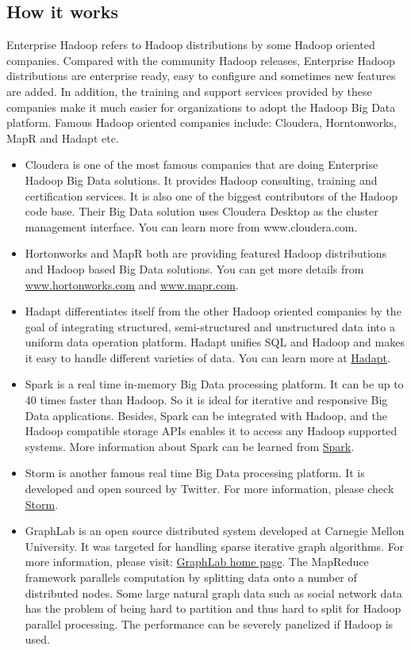 \subsection*{How it works}
Enterprise Hadoop refers to Hadoop distributions by some Hadoop oriented companies. Compared with the community Hadoop releases, Enterprise Hadoop distributions are enterprise ready, easy to configure and sometimes new features are added. In addition, the training and support services provided by these companies make it much easier for organizations to adopt the Hadoop Big Data platform. Famous Hadoop oriented companies include: Cloudera, Horntonworks, MapR and Hadapt etc.
\begin{itemize}
  \item Cloudera is one of the most famous companies that are doing Enterprise Hadoop Big Data solutions. It provides Hadoop consulting, training and certification services. It is also one of the biggest contributors of the Hadoop code base. Their Big Data solution uses Cloudera Desktop as the cluster management interface. You can learn more from www.cloudera.com.
  \item Hortonworks and MapR both are providing featured Hadoop distributions and Hadoop based Big Data solutions. You can get more details from \url{www.hortonworks.com} and \url{www.mapr.com}.
  \item Hadapt differentiates itself from the other Hadoop oriented companies by the goal of integrating structured, semi-structured and unstructured data into a uniform data operation platform. Hadapt unifies SQL and Hadoop and makes it easy to handle different varieties of data. You can learn more at \href{http://hadapt.com/}{Hadapt}.
  \item Spark is a real time in-memory Big Data processing platform. It can be up to 40 times faster than Hadoop. So it is ideal for iterative and responsive Big Data applications. Besides, Spark can be integrated with Hadoop, and the Hadoop compatible storage APIs enables it to access any Hadoop supported systems. More information about Spark can be learned from \href{http://spark-project.org/}{Spark}.
  \item Storm is another famous real time Big Data processing platform. It is developed and open sourced by Twitter. For more information, please check \href{http://storm-project.net/}{Storm}.
  \item GraphLab is an open source distributed system developed at Carnegie Mellon University. It was targeted for handling sparse iterative graph algorithms. For more information, please visit: \href{http://graphlab.org/}{GraphLab home page}. The MapReduce framework parallels computation by splitting data onto a number of distributed nodes. Some large natural graph data such as social network data has the problem of being hard to partition and thus hard to split for Hadoop parallel processing. The performance can be severely panelized if Hadoop is used.

\end{itemize}
